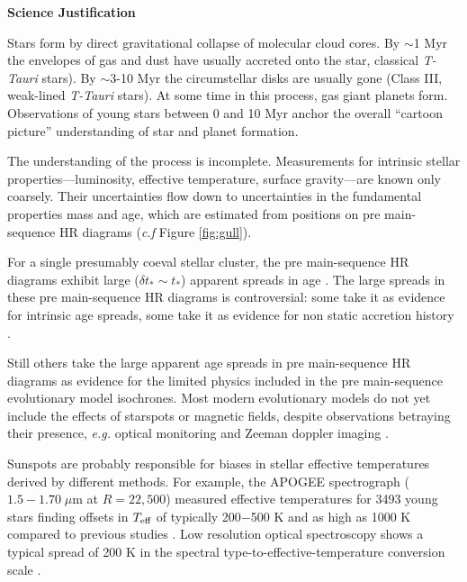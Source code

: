 \documentclass[11pt,aas_macros]{article}
\begin{document}
\begin{center}{\bf Science Justification}\end{center}

Stars form by direct gravitational collapse of molecular cloud cores.  By $\sim$1 Myr the envelopes of gas and dust have usually accreted onto the star, classical \emph{T-Tauri} stars).  By $\sim$3-10 Myr the circumstellar disks are usually gone (Class III, weak-lined \emph{T-Tauri} stars).  At some time in this process, gas giant planets form.  Observations of young stars between 0 and 10 Myr anchor the overall ``cartoon picture'' understanding of star and planet formation.  

The understanding of the process is incomplete.  Measurements for intrinsic stellar properties---luminosity, effective temperature, surface gravity---are known only coarsely.  Their uncertainties flow down to uncertainties in the fundamental properties mass and age, which are estimated from positions on pre main-sequence HR diagrams (\emph{c.f} Figure \ref{fig:gull}).

For a single presumably coeval stellar cluster, the pre main-sequence HR diagrams exhibit large ($\delta t_{\ast} \sim t_{\ast}$) apparent spreads in age \citep[e.g.][]{2011A&A...534A..83R}. The large spreads in these pre main-sequence HR diagrams is controversial: some take it as evidence for intrinsic age spreads, some take it as evidence for non static accretion history \citep{2009ApJ...702L..27B, 2010ARA&A..48..581S}.  

Still others take the large apparent age spreads in pre main-sequence HR diagrams as evidence for the limited physics included in the pre main-sequence evolutionary model isochrones.  Most modern evolutionary models do not yet include the effects of starspots or magnetic fields, despite observations betraying their presence, \emph{e.g.} optical monitoring and Zeeman doppler imaging \citep{2008A&A...479..827G,2014MNRAS.444.3220D}.  

Sunspots are probably responsible for biases in stellar effective temperatures derived by different methods.  For example, the APOGEE spectrograph ($1.5-1.70 \;\mu$m at $R=22,500$) measured effective temperatures for 3493 young stars finding offsets in $T_\textrm{eff}$ of typically 200$-$500 K and as high as 1000 K compared to previous studies \citep{2014ApJ...794..125C}.  Low resolution optical spectroscopy shows a typical spread of 200 K in the spectral type-to-effective-temperature conversion scale \citep{2014ApJ...786...97H}.
\end{document}
